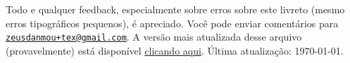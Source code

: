 \vfill

	{

	\noindent \footnotesize Todo e qualquer feedback, especialmente sobre erros sobre este livreto (mesmo erros tipográficos pequenos), é apreciado. Você pode enviar comentários para \href{mailto:zeusdanmou+tex@gmail.com}{\texttt{zeusdanmou+tex@gmail.com}}.
	A versão mais atualizada desse arquivo (provavelmente) está disponível \textcolor{red}{\href{github.com/ZeusDM/latex-problems/blob/master/exams/math/brazil/mo/livreto/livreto_obm.pdf?raw=true}{clicando aqui}}. Última atualização: \today.
	
}

